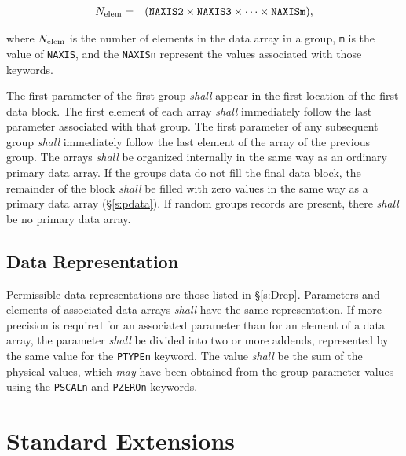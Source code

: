 \documentclass[11pt,makeidx]{book}     %
\begin{document}
\begin{eqnarray}  
   \mbox{$N_{\rm elem}$} &=&  
                     (\mbox{{\tt NAXIS2}} \times \mbox{{\tt NAXIS3}} 
                     \times  \cdots \times \mbox{{\tt NAXISm}}),
\end{eqnarray}

\noindent
  where $N_{\rm elem}$ is the number of elements in the data array in a group,
  {\tt m} is the value of {\tt NAXIS}, 
  and the {\tt NAXISn} represent 
  the values associated with those keywords.

  The first parameter of the first group {\em shall} appear in the first
  location of the first data block.  The first element of each array {\em shall}
  immediately follow the last parameter associated with that group.
  The first parameter of any subsequent group {\em shall} immediately follow
  the last element of the array of the previous group.  The arrays {\em shall}
  be organized internally in the same way as an 
  ordinary primary data array. 
  If the groups data do not fill the final data block, the remainder 
  of the block {\em shall} be filled with zero values in the same
  way as a primary data array (\S\ref{s:pdata}). 
  If random groups records are present, there {\em shall} be no primary data 
  array.
  
\section{Data Representation}
  
  Permissible data representations are those listed in 
  \S\ref{s:Drep}.  Parameters and elements 
  of associated data
  arrays {\em shall} have the same representation.  If more precision
  is required for an associated parameter than for an element of a data
  array, the parameter {\em shall} be divided into two or more 
  addends, represented
  by the same value for the {\tt PTYPEn} keyword. 
  The value {\em shall} be the sum of the physical values, 
  which {\em may} have been obtained 
  from the group parameter values 
  using 
  the {\tt PSCALn} and {\tt PZEROn} keywords.
  

  \chapter{Standard Extensions}
     \label{s:exts}
\end{document}
